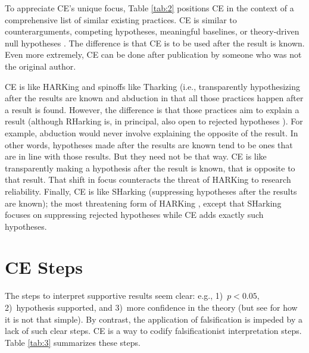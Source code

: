 \documentclass[twocolumn, 10pt]{article}
\begin{document}
To appreciate CE's unique focus, Table \ref{tab:2} positions CE in the context of a comprehensive list of similar existing practices. CE is similar to counterarguments, competing hypotheses, meaningful baselines, or theory-driven null hypotheses \parencite[e.g.,][]{Schwab2012}. The difference is that CE is to be used after the result is known. Even more extremely, CE can be done after publication by someone who was not the original author.

\the\baselineskip

CE is like HARKing and spinoffs like Tharking (i.e., transparently hypothesizing after the results are known \parencite{Hollenbeck2017, Rubin2017} and abduction \parencite{Locke2008, Schwab2017} in that all those practices happen after a result is found. However, the difference is that those practices aim to explain a result (although RHarking is, in principal, also open to rejected hypotheses \parencite{Rubin2017}). For example, abduction would never involve explaining the opposite of the result. In other words, hypotheses made after the results are known tend to be ones that are in line with those results. But they need not be that way. CE is like transparently making a hypothesis after the result is known, that is opposite to that result. That shift in focus counteracts the threat of HARKing to research reliability. Finally, CE is like SHarking (suppressing hypotheses after the results are known); the most threatening form of HARKing \parencite{Rubin2017}, except that SHarking focuses on suppressing rejected hypotheses while CE adds exactly such hypotheses.

\section{CE Steps}

The steps to interpret supportive results seem clear: e.g., 1)\ $p<0.05$, 2)\ hypothesis supported, and 3)\ more confidence in the theory (but see \textcite{Wasserstein2019} for how it is not that simple). By contrast, the application of falsification is impeded by a lack of such clear steps. CE is a way to codify falsificationist interpretation steps. Table \ref{tab:3} summarizes these steps.
\end{document}
